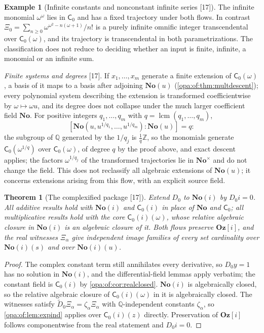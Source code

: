 \documentclass[11pt,oneside]{article}
\numberwithin{equation}{section}
\newtheorem{theorem}{Theorem}[section]
\theoremstyle{definition}
\newtheorem{example}[example]{Example}
\theoremstyle{remark}
\newcommand{\No}{\mathbf{No}}
\newcommand{\Og}{\mathbf{Oz}[i]}
\newcommand{\SC}{\mathbf{No}(i)}
\newcommand{\Q}{\mathbb Q}
\newcommand{\Z}{\mathbb Z}
\newcommand{\src}[1]{\textup{\textsf{\small[#1]}}}
\begin{document}
\begin{example}[Infinite constants and nonconstant infinite series \src{17}]\label{opa:of:ex:constants}
The infinite monomial $\omega^\omega$ lies in $\mathsf C_0$ and has a fixed trajectory under both flows. In contrast
$\Xi_0=\sum_{n\ge0}\omega^{\omega^2-n(\omega+1)}/n!$ is a purely infinite omnific integer transcendental over $\mathsf C_0(\omega)$, and
its trajectory is transcendental in both parametrizations. The classification does not reduce to deciding whether an input is
finite, infinite, a monomial or an infinite sum.
\end{example}

\emph{Finite systems and degrees} \src{17}. If $x_1,\dots,x_m$ generate a finite extension of $\mathsf C_0(\omega)$, a basis of it
maps to a basis after adjoining $\No(u)$ (\cref{opa:of:thm:multdescent}); every polynomial system describing the extension is
transformed coefficientwise by $\omega\mapsto\omega u$, and its degree does not collapse under the much larger coefficient field
$\No$. For positive integers $q_1,\dots,q_m$ with $q=\operatorname{lcm}(q_1,\dots,q_m)$,
\begin{equation}\label{opa:of:eq:lcm}
 [\No(u,u^{1/q_1},\dots,u^{1/q_m}):\No(u)]=q:
\end{equation}
the subgroup of $\Q$ generated by the $1/q_j$ is $\frac1q\Z$, so the monomials generate $\mathsf C_0(\omega^{1/q})$ over
$\mathsf C_0(\omega)$, of degree $q$ by the proof above, and exact descent applies; the factors $\omega^{1/q_j}$ of the transformed
trajectories lie in $\No^\times$ and do not change the field. This does not reclassify all algebraic extensions of $\No(u)$; it
concerns extensions arising from this flow, with an explicit source field.

\begin{theorem}[The complexified package \src{17}]\label{opa:of:thm:complex}
Extend $D_0$ to $\SC$ by $D_0i=0$. All additive results hold with $\SC$ and $\mathsf C_0(i)$ in place of $\No$ and $\mathsf C_0$; all
multiplicative results hold with the core $\mathsf C_0(i)(\omega)$, whose relative algebraic closure in $\SC$ is an algebraic closure
of it. Both flows preserve $\Og$, and the real witnesses $\Xi_\alpha$ give independent image families of every set cardinality
over $\SC(s)$ and over $\SC(u)$.
\end{theorem}
\begin{proof}
The complex constant term still annihilates every derivative, so $D_0y=1$ has no solution in $\SC$, and the differential-field
lemmas apply verbatim; the constant field is $\mathsf C_0(i)$ by \cref{opa:of:cor:realclosed}. $\SC$ is algebraically closed, so the
relative algebraic closure of $\mathsf C_0(i)(\omega)$ in it is algebraically closed. The witnesses satisfy
$\widetilde D_0\Xi_\alpha=\zeta_\alpha\Xi_\alpha$ with $\Q$-independent constants $\zeta_\alpha$, so \cref{opa:of:lem:expind} applies over
$\mathsf C_0(i)(z)$ directly. Preservation of $\Og$ follows componentwise from the real statement and $D_0i=0$.
\end{proof}
\end{document}
